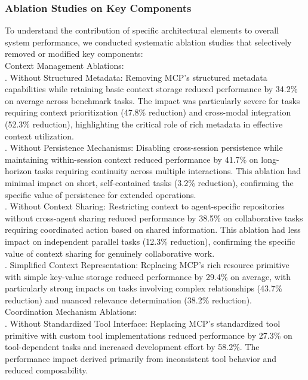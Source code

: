 \subsubsection{Ablation Studies on Key Components}
To understand the contribution of specific architectural elements to overall system performance, we conducted systematic ablation studies that selectively removed or modified key components:\\ \newline
Context Management Ablations:\\ . Without Structured Metadata: Removing MCP's structured metadata capabilities while retaining basic context storage reduced performance by 34.2\% on average across benchmark tasks. The impact was particularly severe for tasks requiring context prioritization (47.8\% reduction) and cross-modal integration (52.3\% reduction), highlighting the critical role of rich metadata in effective context utilization.\\ . Without Persistence Mechanisms: Disabling cross-session persistence while maintaining within-session context reduced performance by 41.7\% on long-horizon tasks requiring continuity across multiple interactions. This ablation had minimal impact on short, self-contained tasks (3.2\% reduction), confirming the specific value of persistence for extended operations.\\ . Without Context Sharing: Restricting context to agent-specific repositories without cross-agent sharing reduced performance by 38.5\% on collaborative tasks requiring coordinated action based on shared information. This ablation had less impact on independent parallel tasks (12.3\% reduction), confirming the specific value of context sharing for genuinely collaborative work.\\ . Simplified Context Representation: Replacing MCP's rich resource primitive with simple key-value storage reduced performance by 29.4\% on average, with particularly strong impacts on tasks involving complex relationships (43.7\% reduction) and nuanced relevance determination (38.2\% reduction).\\ \newline
Coordination Mechanism Ablations:\\ . Without Standardized Tool Interface: Replacing MCP's standardized tool primitive with custom tool implementations reduced performance by 27.3\% on tool-dependent tasks and increased development effort by 58.2\%. The performance impact derived primarily from inconsistent tool behavior and reduced composability.\\ \newline

